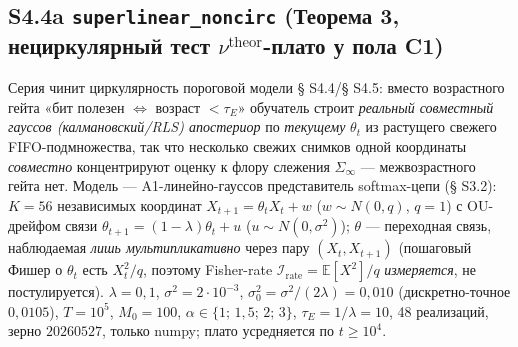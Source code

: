\documentclass[12pt]{iopart}
\providecommand{\texorpdfstring}[2]{#1}
\begin{document}
\subsection{\texorpdfstring{S4.4a \texttt{superlinear\_noncirc} (Теорема 3, нециркулярный тест \(\nu^{\text{theor}}\)-плато у пола C1)}{S4.4a superlinear\_noncirc (Теорема 3, нециркулярный тест \textbackslash nu\^{}\{\textbackslash text\{theor\}\}-плато у пола C1)}}\label{s4.4a-superlinear_noncirc-ux442ux435ux43eux440ux435ux43cux430-3-ux43dux435ux446ux438ux440ux43aux443ux43bux44fux440ux43dux44bux439-ux442ux435ux441ux442-nutexttheor-ux43fux43bux430ux442ux43e-ux443-ux43fux43eux43bux430-c1}



Серия чинит циркулярность пороговой модели § S4.4/§ S4.5: вместо возрастного гейта «бит полезен \(\Leftrightarrow\) возраст \(< \tau_E\)» обучатель строит \emph{реальный совместный гауссов (калмановский/RLS) апостериор} по \emph{текущему} \(\theta_t\) из растущего свежего FIFO-подмножества, так что несколько свежих снимков одной координаты \emph{совместно} концентрируют оценку к флору слежения \(\Sigma_\infty\) --- межвозрастного гейта нет. Модель --- A1-линейно-гауссов представитель softmax-цепи (§ S3.2): \(K = 56\) независимых координат \(X_{t+1} = \theta_t X_t + w\) (\(w\sim N(0,q)\), \(q = 1\)) с OU-дрейфом связи \(\theta_{t+1} = (1-\lambda)\theta_t + u\) (\(u\sim N(0,\sigma^2)\)); \(\theta\) --- переходная связь, наблюдаемая \emph{лишь мультипликативно} через пару \((X_t,X_{t+1})\) (пошаговый Фишер о \(\theta_t\) есть \(X_t^2/q\), поэтому Fisher-rate \(\mathcal I_{\text{rate}} = \mathbb{E}[X^2]/q\) \emph{измеряется}, не постулируется). \(\lambda = 0{,}1\), \(\sigma^2 = 2\cdot10^{-3}\), \(\sigma_0^2 = \sigma^2/(2\lambda) = 0{,}010\) (дискретно-точное \(0{,}0105\)), \(T = 10^5\), \(M_0 = 100\), \(\alpha \in \{1;\,1{,}5;\,2;\,3\}\), \(\tau_E = 1/\lambda = 10\), 48 реализаций, зерно \(20260527\), только numpy; плато усредняется по \(t \ge 10^4\).
\end{document}
